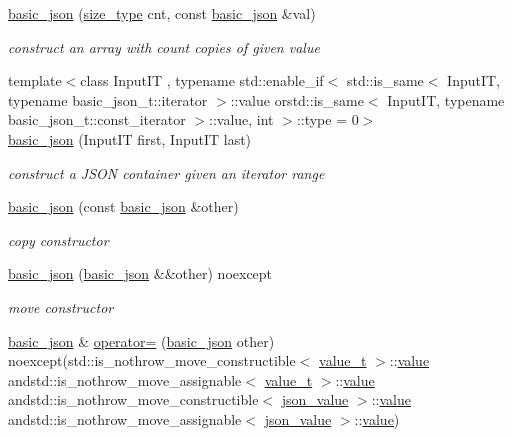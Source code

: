 \begin{DoxyCompactItemize}
\hyperlink{classnlohmann_1_1basic__json_ab6816ae5100409254ed0a8bc21c387bb}{basic\+\_\+json} (\hyperlink{classnlohmann_1_1basic__json_a39f2cd0b58106097e0e67bf185cc519b}{size\+\_\+type} cnt, const \hyperlink{classnlohmann_1_1basic__json}{basic\+\_\+json} \&val)
\begin{DoxyCompactList}\small\item\em construct an array with count copies of given value \end{DoxyCompactList}\item 
{\footnotesize template$<$class Input\+IT , typename std\+::enable\+\_\+if$<$ std\+::is\+\_\+same$<$ Input\+I\+T, typename basic\+\_\+json\+\_\+t\+::iterator $>$\+::value orstd\+::is\+\_\+same$<$ Input\+I\+T, typename basic\+\_\+json\+\_\+t\+::const\+\_\+iterator $>$\+::value, int $>$\+::type  = 0$>$ }\\\hyperlink{classnlohmann_1_1basic__json_abe197e9f3184487805cfb5bba6fd5938}{basic\+\_\+json} (Input\+IT first, Input\+IT last)
\begin{DoxyCompactList}\small\item\em construct a J\+S\+ON container given an iterator range \end{DoxyCompactList}\item 
\hyperlink{classnlohmann_1_1basic__json_af5de621bcf646c332343f9c1e011126c}{basic\+\_\+json} (const \hyperlink{classnlohmann_1_1basic__json}{basic\+\_\+json} \&other)
\begin{DoxyCompactList}\small\item\em copy constructor \end{DoxyCompactList}\item 
\hyperlink{classnlohmann_1_1basic__json_a9a06d1efd50a00f4889f831f851ce124}{basic\+\_\+json} (\hyperlink{classnlohmann_1_1basic__json}{basic\+\_\+json} \&\&other) noexcept
\begin{DoxyCompactList}\small\item\em move constructor \end{DoxyCompactList}\item 
\hyperlink{classnlohmann_1_1basic__json}{basic\+\_\+json} \& \hyperlink{classnlohmann_1_1basic__json_a5e4bbbd028490822e85edf243551c038}{operator=} (\hyperlink{classnlohmann_1_1basic__json}{basic\+\_\+json} other) noexcept(std\+::is\+\_\+nothrow\+\_\+move\+\_\+constructible$<$ \hyperlink{namespacenlohmann_1_1detail_a1ed8fc6239da25abcaf681d30ace4985}{value\+\_\+t} $>$\+::\hyperlink{classnlohmann_1_1basic__json_a404017aa52714a0a4bc79d5af7e4ad2b}{value} andstd\+::is\+\_\+nothrow\+\_\+move\+\_\+assignable$<$ \hyperlink{namespacenlohmann_1_1detail_a1ed8fc6239da25abcaf681d30ace4985}{value\+\_\+t} $>$\+::\hyperlink{classnlohmann_1_1basic__json_a404017aa52714a0a4bc79d5af7e4ad2b}{value} andstd\+::is\+\_\+nothrow\+\_\+move\+\_\+constructible$<$ \hyperlink{unionnlohmann_1_1basic__json_1_1json__value}{json\+\_\+value} $>$\+::\hyperlink{classnlohmann_1_1basic__json_a404017aa52714a0a4bc79d5af7e4ad2b}{value} andstd\+::is\+\_\+nothrow\+\_\+move\+\_\+assignable$<$ \hyperlink{unionnlohmann_1_1basic__json_1_1json__value}{json\+\_\+value} $>$\+::\hyperlink{classnlohmann_1_1basic__json_a404017aa52714a0a4bc79d5af7e4ad2b}{value})

\end{DoxyCompactItemize}
